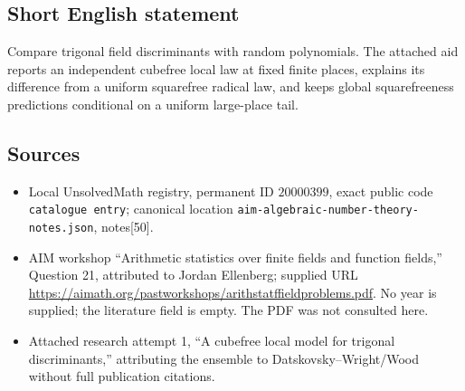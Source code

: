 \documentclass[11pt]{article}
\begin{document}
\subsection{Short English statement}
Compare trigonal field discriminants with random polynomials. The attached aid reports an independent cubefree local law at fixed finite places, explains its difference from a uniform squarefree radical law, and keeps global squarefreeness predictions conditional on a uniform large-place tail.
\subsection{Sources}
\begin{itemize}
\item Local UnsolvedMath registry, permanent ID \(20000399\), exact public code \texttt{catalogue entry}; canonical location \texttt{aim-algebraic-number-theory-notes.json}, notes[50].
\item AIM workshop ``Arithmetic statistics over finite fields and function fields,'' Question 21, attributed to Jordan Ellenberg; supplied URL \url{https://aimath.org/pastworkshops/arithstatffieldproblems.pdf}. No year is supplied; the literature field is empty. The PDF was not consulted here.
\item Attached research attempt 1, ``A cubefree local model for trigonal discriminants,'' attributing the ensemble to Datskovsky--Wright/Wood without full publication citations.
\end{itemize}
\end{document}
